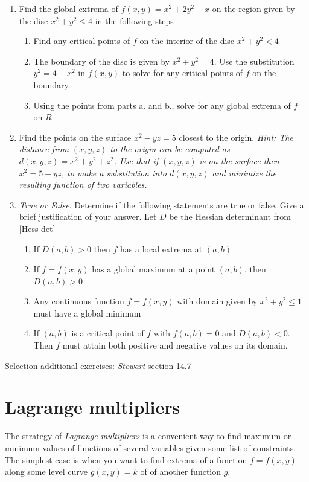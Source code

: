\documentclass[12pt]{article}
\numberwithin{equation}{subsection}
\numberwithin{figure}{subsection}
\theoremstyle{note}
\begin{document}
{\begin{enumerate}[label=\arabic*.]
\item Find the global extrema of $f(x,y)=x^2+2y^2-x$ on the region given by the disc $x^2+y^2\leq 4$ in the following steps
\begin{enumerate}
	\item Find any critical points of $f$ on the interior of the disc $x^2+y^2<4$
	\item The boundary of the disc is given by $x^2+y^2=4$. Use the substitution $y^2=4-x^2$ in $f(x,y)$ to solve for any critical points of $f$ on the boundary.
	\item Using the points from parts a. and b., solve for any global extrema of $f$ on $R$
\end{enumerate}

\item Find the points on the surface $x^2-yz=5$ closest to the origin. \textit{Hint: The distance from $(x,y,z)$ to the origin can be computed as $d(x,y,z)=x^2+y^2+z^2$. Use that if $(x,y,z)$ is on the surface then $x^2=5+yz$, to make a substitution into $d(x,y,z)$ and minimize the resulting function of two variables.}

\item \textit{True or False}. Determine if the following statements are true or false. Give a brief justification of your answer. Let $D$ be the Hessian determinant from \eqref{Hess-det}

\begin{enumerate}
	\item If $D(a,b)>0$ then $f$ has a local extrema at $(a,b)$
	\item If $f=f(x,y)$ has a global maximum at a point $(a,b)$, then $D(a,b)>0$
	\item Any continuous function $f=f(x,y)$ with domain given by $x^2+y^2\leq 1$ must have a global minimum
	\item If $(a,b)$ is a critical point of $f$ with $f(a,b)=0$ and $D(a,b)<0$. Then $f$ must attain both positive and negative values on its domain.

\end{enumerate}
\end{enumerate}

Selection additional exercises: \textit{Stewart} section 14.7

\section{Lagrange multipliers} \label{LM}

The strategy of \textit{Lagrange multipliers} is a convenient way to find maximum or minimum values of functions of several variables given some list of constraints. The simplest case is when you want to find extrema of a function $f=f(x,y)$ along some level curve $g(x,y)=k$ of of another function $g$.

}
\end{document}
